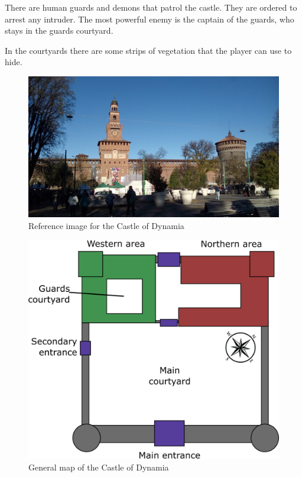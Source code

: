 There are human guards and demons that patrol the castle. They are ordered to arrest any intruder. The most powerful enemy is the captain of the guards, who stays in the guards courtyard.

In the courtyards there are some strips of vegetation that the player can use to hide.

\begin{figure}[H]
  \centering
  \includegraphics[width=\textwidth]{../../../References/Images/Dynamia/CastleOfDynamia/20181208_100357}
  \caption{Reference image for the Castle of Dynamia}
\end{figure}

\begin{figure}[H]
  \centering
  \includegraphics[width=12cm]{Images/Maps/castleOfDynamiaFull}
  \caption{General map of the Castle of Dynamia}
\end{figure}

